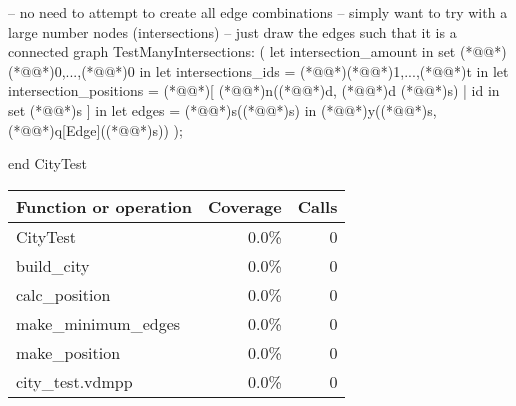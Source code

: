 \documentclass[a4paper]{article}
\begin{document}
\begin{vdm_al}
    -- no need to attempt to create all edge combinations
    -- simply want to try with a large number nodes (intersections)
    -- just draw the edges such that it is a connected graph
    TestManyIntersections:
        (
            let intersection_amount in set (*@\vdmnotcovered{}@*){(*@\vdmnotcovered{}@*)0,...,(*@@*)0} in
            let intersections_ids = (*@\vdmnotcovered{}@*){(*@\vdmnotcovered{}@*)1,...,(*@@*)t} in
            let intersection_positions = (*@\vdmnotcovered{}@*)[
                (*@@*)n((*@@*)d, (*@@*)d (*@@*)s)
                | id in set (*@@*)s
            ] in
            let edges = (*@@*)s((*@@*)s) in
            (*@@*)y((*@@*)s, (*@@*)q[Edge]((*@@*)s))
        );


end CityTest
\end{vdm_al}
\bigskip
\begin{longtable}{|l|r|r|}
\hline
Function or operation & Coverage & Calls \\
\hline
\hline
CityTest & 0.0\% & 0 \\
\hline
build\_city & 0.0\% & 0 \\
\hline
calc\_position & 0.0\% & 0 \\
\hline
make\_minimum\_edges & 0.0\% & 0 \\
\hline
make\_position & 0.0\% & 0 \\
\hline
\hline
city\_test.vdmpp & 0.0\% & 0 \\
\hline
\end{longtable}
\end{document}
